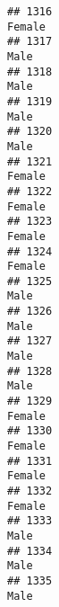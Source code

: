 \documentclass[]{article}
\begin{document}
\begin{verbatim}
## 1316                                                                                                                          Female
## 1317                                                                                                                            Male
## 1318                                                                                                                            Male
## 1319                                                                                                                            Male
## 1320                                                                                                                            Male
## 1321                                                                                                                          Female
## 1322                                                                                                                          Female
## 1323                                                                                                                          Female
## 1324                                                                                                                          Female
## 1325                                                                                                                            Male
## 1326                                                                                                                            Male
## 1327                                                                                                                            Male
## 1328                                                                                                                            Male
## 1329                                                                                                                          Female
## 1330                                                                                                                          Female
## 1331                                                                                                                          Female
## 1332                                                                                                                          Female
## 1333                                                                                                                            Male
## 1334                                                                                                                            Male
## 1335                                                                                                                            Male

\end{verbatim}
\end{document}
